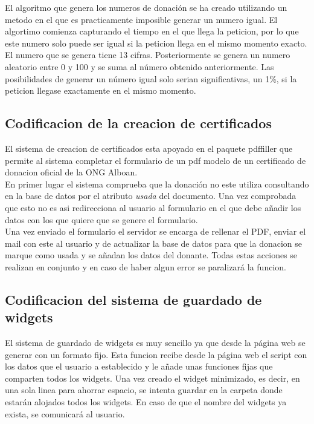 El algoritmo que genera los numeros de donación se ha creado utilizando un metodo en el que es practicamente imposible generar un numero igual. El algortimo comienza capturando el tiempo en el que llega la peticion, por lo que este numero solo puede ser igual si la peticion llega en el mismo momento exacto. El numero que se genera tiene 13 cifras. Posteriormente se genera un numero aleatorio entre 0 y 100 y se suma al número obtenido anteriormente. Las posibilidades de generar un número igual solo serian significativas, un 1\%, si la peticion llegase exactamente en el mismo momento.\\


\subsection{Codificacion de la creacion de certificados}
El sistema de creacion de certificados esta apoyado en el paquete pdffiller que permite al sistema completar el formulario de un pdf modelo de un certificado de donacion oficial de la ONG Alboan. \\

En primer lugar el sistema comprueba que la donación no este utiliza consultando en la base de datos por el atributo \textit{usada} del documento. Una vez comprobada que esto no es asi redirecciona al usuario al formulario en el que debe añadir los datos con los que quiere que se genere el formulario.\\

Una vez enviado el formulario el servidor se encarga de rellenar el PDF, enviar el mail con este al usuario y de actualizar la base de datos para que la donacion se marque como usada y se añadan los datos del donante. Todas estas acciones se realizan en conjunto y en caso de haber algun error se paralizará la funcion.

\subsection{Codificacion del sistema de guardado de widgets}
El sistema de guardado de widgets es muy sencillo ya que desde la página web se generar con un formato fijo. Esta funcion recibe desde la página web el script con los datos que el usuario a establecido y le añade unas funciones fijas que comparten todos los widgets. Una vez creado el widget minimizado, es decir, en una sola linea para ahorrar espacio, se intenta guardar en la carpeta donde estarán alojados todos los widgets. En caso de que el nombre del widgets ya exista, se comunicará al usuario. \\

